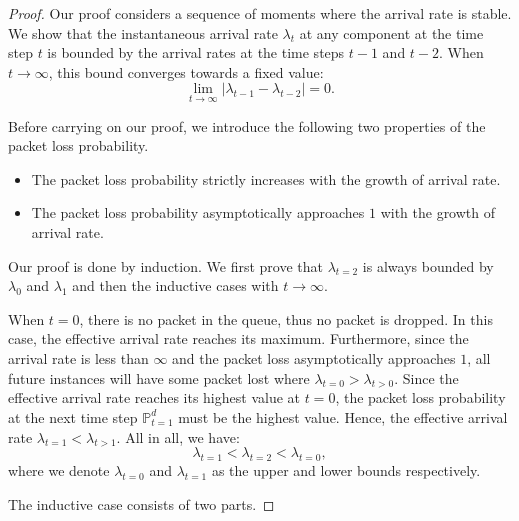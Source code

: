 \documentclass[journal]{IEEEtran}
\begin{document}
\begin{proof}
Our proof considers a sequence of moments where the arrival rate is stable. We show that the instantaneous arrival rate $\lambda_t$ at any component at the time step $t$ is bounded by the arrival rates at the time steps $t-1$ and $t-2$. When $t\to\infty$, this bound converges towards a fixed value: %
\begin{equation}
	\lim_{t\to\infty }{{\left|\lambda_{t-1}-\lambda_{t-2}\right|}}=0.
\end{equation}

Before carrying on our proof, we introduce the following two properties of the packet loss probability.
\begin{itemize}
	\item The packet loss probability strictly increases with the growth of arrival rate.
	\item The packet loss probability asymptotically approaches $1$ with the growth of arrival rate.
\end{itemize}

Our proof is done by induction. We first prove that $\lambda_{t=2}$ is always bounded by $\lambda_{0}$ and $\lambda_{1}$ and then the inductive cases with $t\to \infty$. 

When $t=0$, there is no packet in the queue, thus no packet is dropped. In this case, the effective arrival rate reaches its maximum. Furthermore, since the arrival rate is less than $\infty$ and the packet loss asymptotically approaches $1$, all future instances will have some packet lost where $\lambda_{t=0}>\lambda_{t>0}$. Since the effective arrival rate reaches its highest value at $t=0$, the packet loss probability at the next time step $\mathbb{P}^d_{t=1}$ must be the highest value. Hence, the effective arrival rate $\lambda_{t=1} < \lambda_{t>1}$. All in all, we have:
\begin{equation}
	\lambda_{t=1}<\lambda_{t=2}<\lambda_{t=0},
\end{equation}
where we denote $\lambda_{t=0}$ and $\lambda_{t=1}$ as the upper and lower bounds respectively.

The inductive case consists of two parts.


\end{proof}
\end{document}
